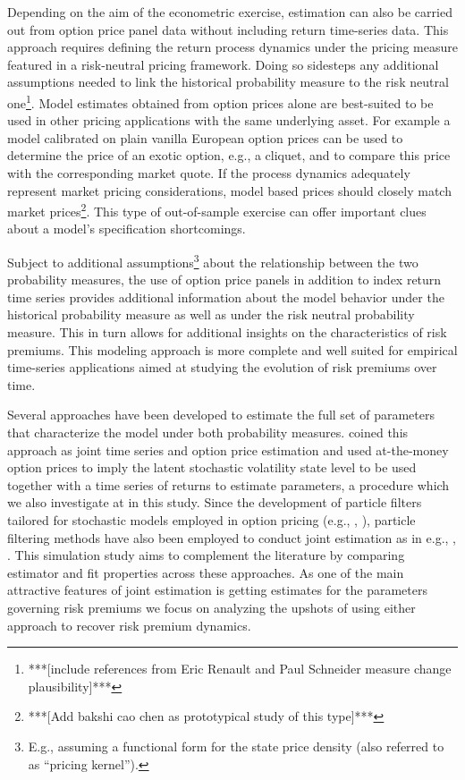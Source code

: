 \documentclass[11pt,a4paper,notitlepage]{article}
\numberwithin{equation}{section}
\begin{document}
Depending on the aim of the econometric exercise, estimation can also be carried out from option price panel data without including return time-series data. This approach requires defining the return process dynamics under the pricing measure featured in a risk-neutral pricing framework. Doing so sidesteps any additional assumptions needed to link the historical probability measure to the risk neutral one\footnote{***[include references from Eric Renault and Paul Schneider measure change plausibility]***}. Model estimates obtained from option prices alone are best-suited to be used in other pricing applications with the same underlying asset. For example a \citet{heston} model calibrated on plain vanilla European option prices can be used to determine the price of an exotic option, e.g., a cliquet, and to compare this price with the corresponding market quote. If the process dynamics adequately represent market pricing considerations, model based prices should closely match market prices\footnote{***[Add bakshi cao chen as prototypical study of this type]***}. This type of out-of-sample exercise can offer important clues about a model's specification shortcomings.  

Subject to additional assumptions\footnote{E.g., assuming a functional form for the state price density (also referred to as ``pricing kernel'').} about the relationship between the two  probability measures, the use of option price panels in addition to index return time series provides additional information about the model behavior under the historical probability measure as well as under the risk neutral probability measure. This in turn allows for additional insights on the characteristics of risk premiums. This modeling approach is more complete and well suited for empirical time-series applications aimed at studying the evolution of risk premiums over time. 

Several approaches have been developed to estimate the full set of parameters that characterize the model under both probability measures. \cite{pan2002jump} coined this approach as joint time series and option price estimation and used at-the-money option prices to imply the latent stochastic volatility state level to be used together with a time series of returns to estimate parameters, a procedure which we also investigate at in this study. Since the development of particle filters tailored for stochastic models employed in option pricing (e.g., \cite{bates2006maximum}, \cite{johannes2009optimal}), particle filtering methods have also been employed to conduct joint estimation as in e.g., \cite{christoffersen2010volatility}, \cite{bardgett2014inferring}. This simulation study aims to complement the literature by comparing estimator and fit properties across these approaches. As one of the main attractive features of joint estimation is getting estimates for the parameters governing risk premiums we focus on analyzing the upshots of using either approach to recover risk premium dynamics.  
\end{document}
